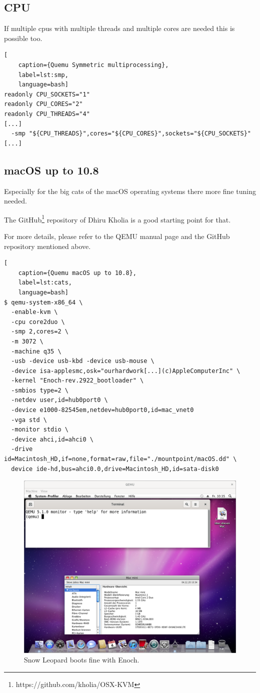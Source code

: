 \subsection{CPU}

If multiple cpus with multiple threads and multiple cores are needed this is possible too.

\begin{lstlisting}[
    caption={Quemu Symmetric multiprocessing},
    label=lst:smp,
    language=bash]
readonly CPU_SOCKETS="1"
readonly CPU_CORES="2"
readonly CPU_THREADS="4"
[...]
  -smp "${CPU_THREADS}",cores="${CPU_CORES}",sockets="${CPU_SOCKETS}"
[...]
\end{lstlisting}

\subsection{macOS up to 10.8}

Especially for the big cats of the macOS operating systems there more fine tuning needed.

The GitHub\footnote{https://github.com/kholia/OSX-KVM} repository of Dhiru Kholia is a good starting point for that.

For more details, please refer to the QEMU manual page and the GitHub repository mentioned above.

\begin{lstlisting}[
    caption={Quemu macOS up to 10.8},
    label=lst:cats,
    language=bash]
$ qemu-system-x86_64 \
  -enable-kvm \
  -cpu core2duo \
  -smp 2,cores=2 \
  -m 3072 \
  -machine q35 \
  -usb -device usb-kbd -device usb-mouse \
  -device isa-applesmc,osk="ourhardwork[...](c)AppleComputerInc" \
  -kernel "Enoch-rev.2922_bootloader" \
  -smbios type=2 \
  -netdev user,id=hub0port0 \
  -device e1000-82545em,netdev=hub0port0,id=mac_vnet0
  -vga std \
  -monitor stdio \
  -device ahci,id=ahci0 \
  -drive id=Macintosh_HD,if=none,format=raw,file="./mountpoint/macOS.dd" \
  device ide-hd,bus=ahci0.0,drive=Macintosh_HD,id=sata-disk0
\end{lstlisting}

\begin{figure}[htbp]  %
  \centering
  \includegraphics[width=.75\textwidth]{figures/boot-macos-snow-leopard.png}
  \caption[Qemu macOS big cat]{Snow Leopard boots fine with Enoch.}
  \label{fig:cats}
\end{figure}

